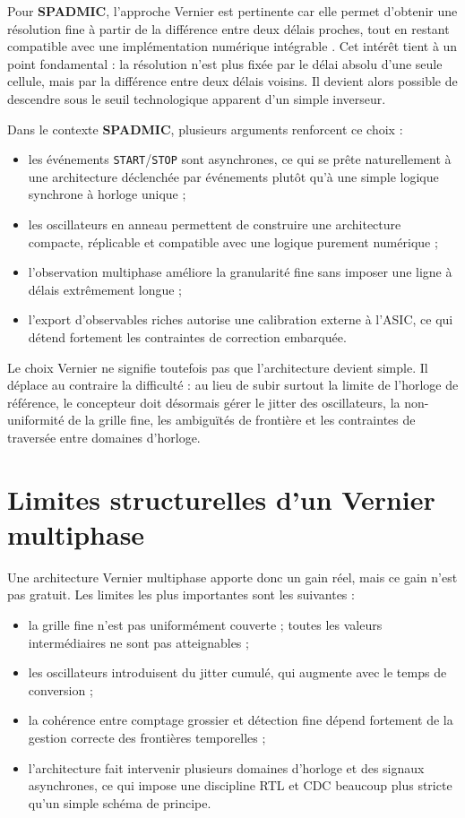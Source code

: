 Pour \textbf{SPADMIC}, l'approche Vernier est pertinente car elle permet d'obtenir une résolution fine à partir de la différence entre deux délais proches, tout en restant compatible avec une implémentation numérique intégrable \cite{annagrebah2021thesis,henzler2010tdc,dudek2000vernier}. Cet intérêt tient à un point fondamental : la résolution n'est plus fixée par le délai absolu d'une seule cellule, mais par la différence entre deux délais voisins. Il devient alors possible de descendre sous le seuil technologique apparent d'un simple inverseur.

Dans le contexte \textbf{SPADMIC}, plusieurs arguments renforcent ce choix :
\begin{itemize}
    \item les événements \texttt{START}/\texttt{STOP} sont asynchrones, ce qui se prête naturellement à une architecture déclenchée par événements plutôt qu'à une simple logique synchrone à horloge unique ;
    \item les oscillateurs en anneau permettent de construire une architecture compacte, réplicable et compatible avec une logique purement numérique ;
    \item l'observation multiphase améliore la granularité fine sans imposer une ligne à délais extrêmement longue ;
    \item l'export d'observables riches autorise une calibration externe à l'ASIC, ce qui détend fortement les contraintes de correction embarquée.
\end{itemize}

Le choix Vernier ne signifie toutefois pas que l'architecture devient simple. Il déplace au contraire la difficulté : au lieu de subir surtout la limite de l'horloge de référence, le concepteur doit désormais gérer le jitter des oscillateurs, la non-uniformité de la grille fine, les ambiguïtés de frontière et les contraintes de traversée entre domaines d'horloge.

\section{Limites structurelles d'un Vernier multiphase}

Une architecture Vernier multiphase apporte donc un gain réel, mais ce gain n'est pas gratuit. Les limites les plus importantes sont les suivantes :
\begin{itemize}
    \item la grille fine n'est pas uniformément couverte ; toutes les valeurs intermédiaires ne sont pas atteignables ;
    \item les oscillateurs introduisent du jitter cumulé, qui augmente avec le temps de conversion ;
    \item la cohérence entre comptage grossier et détection fine dépend fortement de la gestion correcte des frontières temporelles ;
    \item l'architecture fait intervenir plusieurs domaines d'horloge et des signaux asynchrones, ce qui impose une discipline RTL et CDC beaucoup plus stricte qu'un simple schéma de principe.
\end{itemize}

